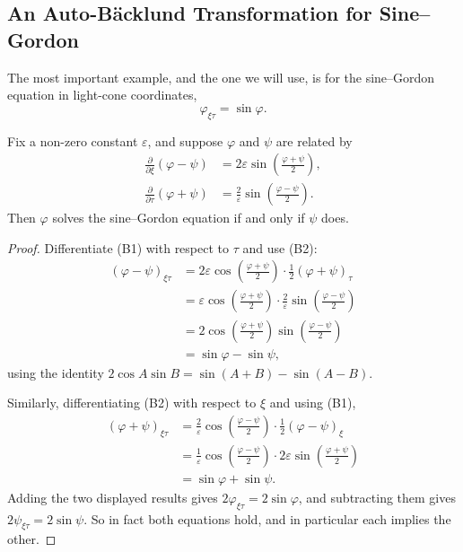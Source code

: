 \subsection{An Auto-B\"acklund Transformation for Sine--Gordon}

The most important example, and the one we will use, is for the sine--Gordon equation in light-cone coordinates,
$$
\varphi_{\xi\tau} = \sin\varphi.
$$

\begin{proposition}
	Fix a non-zero constant $\varepsilon$, and suppose $\varphi$ and $\psi$ are related by
	\begin{align}
		\frac{\partial}{\partial\xi}\left(\varphi - \psi\right) &= 2\varepsilon\sin\left(\frac{\varphi+\psi}{2}\right),\tag{B1}\\
		\frac{\partial}{\partial\tau}\left(\varphi + \psi\right) &= \frac{2}{\varepsilon}\sin\left(\frac{\varphi-\psi}{2}\right).\tag{B2}
	\end{align}
	Then $\varphi$ solves the sine--Gordon equation if and only if $\psi$ does.
\end{proposition}
\begin{proof}
	Differentiate (B1) with respect to $\tau$ and use (B2):
	\begin{align*}
		\left(\varphi-\psi\right)_{\xi\tau} &= 2\varepsilon\cos\left(\frac{\varphi+\psi}{2}\right)\cdot\frac{1}{2}\left(\varphi+\psi\right)_\tau\\
		&= \varepsilon\cos\left(\frac{\varphi+\psi}{2}\right)\cdot\frac{2}{\varepsilon}\sin\left(\frac{\varphi-\psi}{2}\right)\\
		&= 2\cos\left(\frac{\varphi+\psi}{2}\right)\sin\left(\frac{\varphi-\psi}{2}\right)\\
		&= \sin\varphi - \sin\psi,
	\end{align*}
	using the identity $2\cos A\sin B = \sin(A+B) - \sin(A-B)$.

	Similarly, differentiating (B2) with respect to $\xi$ and using (B1),
	\begin{align*}
		\left(\varphi+\psi\right)_{\xi\tau} &= \frac{2}{\varepsilon}\cos\left(\frac{\varphi-\psi}{2}\right)\cdot\frac{1}{2}\left(\varphi-\psi\right)_\xi\\
		&= \frac{1}{\varepsilon}\cos\left(\frac{\varphi-\psi}{2}\right)\cdot2\varepsilon\sin\left(\frac{\varphi+\psi}{2}\right)\\
		&= \sin\varphi + \sin\psi.
	\end{align*}
	Adding the two displayed results gives $2\varphi_{\xi\tau} = 2\sin\varphi$, and subtracting them gives $2\psi_{\xi\tau} = 2\sin\psi$. So in fact both equations hold, and in particular each implies the other.
\end{proof}

